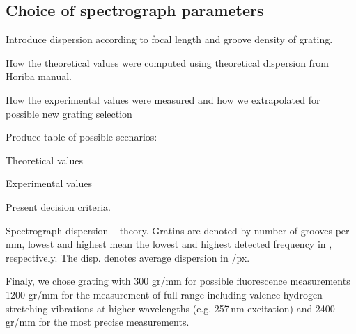 \subsection{Choice of spectrograph parameters}
\begin{docitemize}
	\item Introduce dispersion according to focal length and groove density of
	grating.
	\begin{docitemize}
		\item How the theoretical values were computed using theoretical dispersion
			from Horiba manual.
		\item How the experimental values were measured and how we extrapolated
			for possible new grating selection
	\end{docitemize}
	\item Produce table of possible scenarios:
	\begin{docitemize}
		\item Theoretical values 
		\item Experimental values
	\end{docitemize}
	\item Present decision criteria.
\end{docitemize}


\begin{table}
	\centering
	
	\caption{Spectrograph dispersion -- theory. Gratins are denoted by number
		of grooves per mm, lowest and highest mean the lowest and highest detected
		frequency in \icm, respectively. The disp. denotes average dispersion in
		\icm/px.}
	\label{\tablabel{spectrograph_selection:dispersion_theory}}
\end{table}

Finaly, we chose grating with 300 gr/mm for possible fluorescence measurements
1200 gr/mm for the measurement of full range including valence hydrogen
stretching vibrations at higher wavelengths (e.g. 257\,nm excitation) and
2400 gr/mm for the most precise measurements.